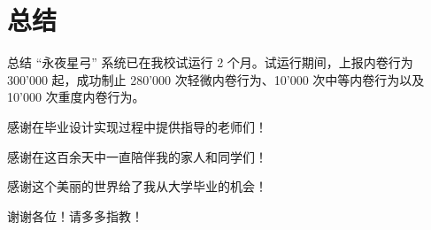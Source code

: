 %
%
%
%
\section{总结}
    \begin{frame}{总结}
        “永夜星弓” 系统已在我校试运行 2 个月。试运行期间，上报内卷行为 300'000 起，成功制止 280'000 次轻微内卷行为、10'000 次中等内卷行为以及 10'000 次重度内卷行为。

        \begin{center}
            感谢在毕业设计实现过程中提供指导的老师们！

            感谢在这百余天中一直陪伴我的家人和同学们！

            感谢这个美丽的世界给了我从大学毕业的机会！
        \end{center}

        \begin{center}
            谢谢各位！请多多指教！
        \end{center}
    \end{frame}
